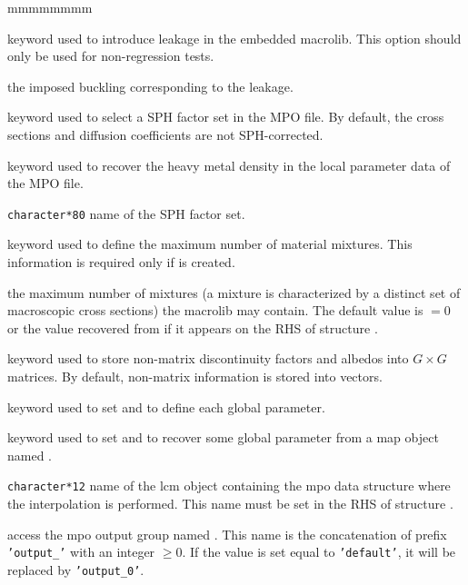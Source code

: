 \begin{ListeDeDescription}{mmmmmmmm}
\item[\moc{LEAK}] keyword used to introduce leakage in the embedded {\sc macrolib}. This option should only be used for non-regression tests.

\item[\dusa{b2}] the imposed buckling corresponding to the leakage.

\item[\moc{EQUI}] keyword used to select a SPH factor set in the MPO file. By default, the cross sections and diffusion coefficients
are not SPH-corrected.

\item[\moc{MASL}] keyword used to recover the heavy metal density in the local parameter data of the MPO file. 

\item[\dusa{text80}] {\tt character*80} name of the SPH factor set.

\item[\moc{NMIX}] keyword used to define the maximum number of material mixtures. This information is required only if  is created.

\item[\dusa{nmixt}] the maximum number of mixtures (a mixture is characterized by a distinct set of 
macroscopic cross sections) the {\sc macrolib} may contain. The default value is  $=0$ or the value recovered from  if it appears on the RHS
of structure .

\item[\moc{MDF}] keyword used to store non-matrix discontinuity factors and albedos into $G\times G$ matrices. By default, non-matrix information is stored into vectors.

\item[\moc{MPO}] keyword used to set  and to define each global parameter.

\item[\moc{TABLE}] keyword used to set  and to recover some global parameter from a {\sc map} object named .

\item[\dusa{MPONAM}] {\tt character*12} name of the {\sc lcm} object containing the
{\sc mpo} data structure where the interpolation is performed. This name must be set in the RHS of structure .

\item[\dusa{NAMDIR}] access the {\sc mpo} output group named . This name is the concatenation of prefix {\tt 'output\_'} with an integer $\ge 0$.
If the value is set equal to {\tt 'default'}, it will be replaced by {\tt 'output\_0'}.


\end{ListeDeDescription}
